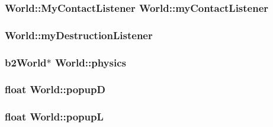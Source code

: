 \subsubsection[{my\+Contact\+Listener}]{\setlength{\rightskip}{0pt plus 5cm} {\bf World\+::\+My\+Contact\+Listener}  World\+::my\+Contact\+Listener\hspace{0.3cm}{\ttfamily [private]}}\label{classWorld_a558284d05f4c41360eacba52df48c389}
\hypertarget{classWorld_a9fe52553a01225766d31480cc99b79ef}{}
\subsubsection[{my\+Destruction\+Listener}]{ World\+::my\+Destruction\+Listener\hspace{0.3cm}{\ttfamily [static]}}\label{classWorld_a9fe52553a01225766d31480cc99b79ef}
\hypertarget{classWorld_a99f3098ee94a83726a1ea67ea515417f}{}
\subsubsection[{physics}]{\setlength{\rightskip}{0pt plus 5cm}b2\+World$\ast$ World\+::physics\hspace{0.3cm}{\ttfamily [protected]}}\label{classWorld_a99f3098ee94a83726a1ea67ea515417f}
\hypertarget{classWorld_ac01138a7966b75a74c468f3a45aa58ee}{}
\subsubsection[{popup\+D}]{\setlength{\rightskip}{0pt plus 5cm}float World\+::popup\+D\hspace{0.3cm}{\ttfamily [private]}}\label{classWorld_ac01138a7966b75a74c468f3a45aa58ee}
\hypertarget{classWorld_a66ec162a547f0b34a40b98f867833f64}{}
\subsubsection[{popup\+L}]{\setlength{\rightskip}{0pt plus 5cm}float World\+::popup\+L\hspace{0.3cm}{\ttfamily [private]}}\label{classWorld_a66ec162a547f0b34a40b98f867833f64}
\hypertarget{classWorld_a9fafe9a7426c487a992615e518e90b23}{}

